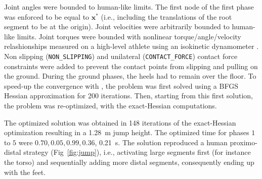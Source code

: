 Joint angles were bounded to human-like limits.
The first node of the first phase was enforced to be equal to $\mathbf{x^*}$ (i.e., including the translations of the root segment to be at the origin). 
Joint velocities were arbitrarily bounded to human-like limits.
Joint torques were bounded with nonlinear torque/angle/velocity relashionships measured on a high-level athlete using an isokinetic dynamometer \cite{jacksonMechanicsTableContact2010}. 
Non slipping (\texttt{NON\_SLIPPING}) and unilateral (\texttt{CONTACT\_FORCE}) contact force constraints were added to prevent the contact points from slipping and pulling on the ground.
During the ground phases, the heels had to remain over the floor.
To speed-up the convergence with \ipopt, the problem was first solved using a BFGS Hessian approximation for 200 iterations.
Then, starting from this first solution, the problem was re-optimized, with the exact-Hessian computations.

The optimized solution was obtained in 148 iterations of the exact-Hessian optimization resulting in a \SI{1.28}{\meter} jump height.
The optimized time for phases $1$ to $5$ were $0.70, 0.05, 0.99, 0.36$, \SI{0.21}{\second}.
The solution reproduced a human proximo-distal strategy (Fig~\ref{fig:jump}), i.e., activating large segments first (for instance the torso) and sequentially adding more distal segments, consequently ending up with the feet.
